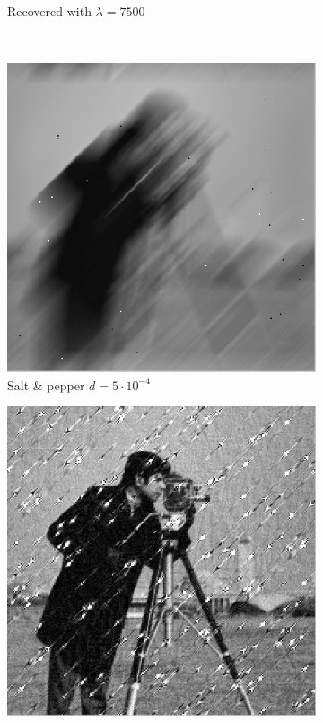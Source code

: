 \documentclass[a4paper, 10pt, conference] {article}
\begin{document}
\begin{figure}[H]
\begin{subfigure}{0.49\textwidth}
		\caption{Recovered with $\lambda = 7500$}
	\end{subfigure}\\
	\begin{subfigure}{0.49\textwidth} 
		\centering						
		\includegraphics[scale=0.48]{motion/noisy/saltpepper00005.PNG}
		\caption{Salt \& pepper $d =5\cdot 10^{-4}$}
	\end{subfigure}
	\begin{subfigure}{0.49\textwidth} 
		\centering						
		\includegraphics[scale=0.48]{motion/noisy/recovered_saltpepper00005.PNG}

\end{subfigure}
\end{figure}
\end{document}
